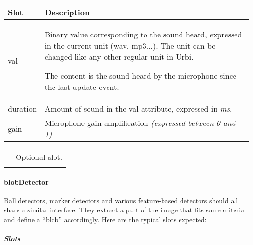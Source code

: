 \documentclass[a4paper]{article}
\begin{document}
\begin{flushleft}
\tablehead{}
\begin{supertabular}{|m{3.293cm}|m{11.997cm}|}
\hline
\sffamily\bfseries Slot &
\sffamily\bfseries Description\\\hline
val &
 Binary value corresponding to the
sound heard, expressed in the current unit (wav, mp3...). The unit can
be changed like any other regular unit in Urbi.

\textsf{The content is the sound heard by the
microphone since the last }update\textsf{ event.}\\\hline
duration &
\textsf{Amount of sound in the }val\textsf{
attribute, expressed in }\textsf{\textit{ms}}\textsf{.}\\\hline
gain &
\textsf{Microphone gain amplification
}\textsf{\textit{(expressed between 0 and 1)}}\\\hline
\end{supertabular}
\end{flushleft}
\begin{flushleft}
\tablehead{}
\begin{supertabular}{|m{1.717cm}|m{10.464cm}}
\hhline{-~}
 &
\sffamily Optional slot.\\\hhline{-~}
\end{supertabular}
\end{flushleft}
\paragraph{blobDetector}


Ball detectors, marker detectors and various feature-based detectors
should all share a similar interface. They extract a part of the image
that fits some criteria and define a “blob” accordingly. Here are the
typical slots expected:

\subparagraph{Slots}
\end{document}

